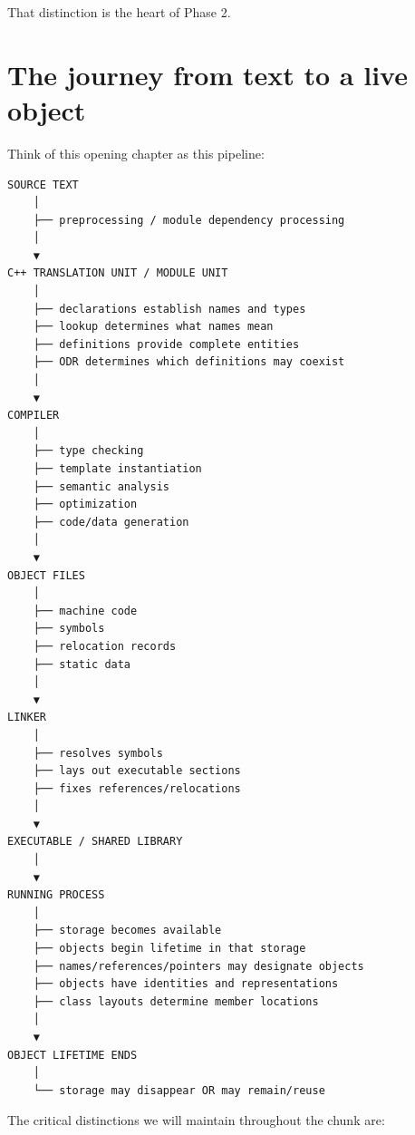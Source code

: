 That distinction is the heart of Phase 2.

\section{The journey from text to a live object}\label{05-engine-i-ch002-the-journey-from-text-to-a-live-object}

Think of this opening chapter as this pipeline:

\begin{verbatim}
SOURCE TEXT
    │
    ├── preprocessing / module dependency processing
    │
    ▼
C++ TRANSLATION UNIT / MODULE UNIT
    │
    ├── declarations establish names and types
    ├── lookup determines what names mean
    ├── definitions provide complete entities
    ├── ODR determines which definitions may coexist
    │
    ▼
COMPILER
    │
    ├── type checking
    ├── template instantiation
    ├── semantic analysis
    ├── optimization
    ├── code/data generation
    │
    ▼
OBJECT FILES
    │
    ├── machine code
    ├── symbols
    ├── relocation records
    ├── static data
    │
    ▼
LINKER
    │
    ├── resolves symbols
    ├── lays out executable sections
    ├── fixes references/relocations
    │
    ▼
EXECUTABLE / SHARED LIBRARY
    │
    ▼
RUNNING PROCESS
    │
    ├── storage becomes available
    ├── objects begin lifetime in that storage
    ├── names/references/pointers may designate objects
    ├── objects have identities and representations
    ├── class layouts determine member locations
    │
    ▼
OBJECT LIFETIME ENDS
    │
    └── storage may disappear OR may remain/reuse
\end{verbatim}

The critical distinctions we will maintain throughout the chunk are:

